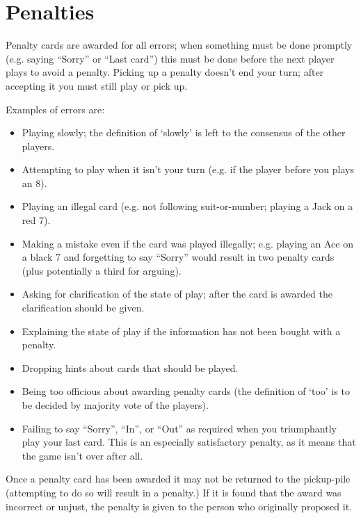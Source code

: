 \documentclass[12pt]{article}
\begin{document}
\section{Penalties}
\label{penalties}

Penalty cards are awarded for all errors; when something must be done promptly (e.g. saying ``Sorry'' or
``Last card'') this must be done before the next player plays to avoid a penalty.  Picking up a penalty
doesn't end your turn; after accepting it you must still play or pick up.

Examples of errors are:

\begin{itemize}
  \item Playing slowly;  the definition of `slowly' is left to the consensus of the other players.

  \item Attempting to play when it isn't your turn (e.g. if the player before you plays an 8).

  \item Playing an illegal card (e.g. not following suit-or-number;  playing a Jack on a red 7).

  \item Making a mistake even if the card was played illegally;  e.g. playing an Ace on a
    black 7 and forgetting to say ``Sorry'' would result in two penalty cards (plus potentially
    a third for arguing).

  \item Asking for clarification of the state of play;  after the card is awarded the
    clarification should be given.

  \item Explaining the state of play if the information has not been bought with a penalty.
    
  \item Dropping hints about cards that should be played.

  \item Being too officious about awarding penalty cards (the definition of `too' is
    to be decided by majority vote of the players).

  \item Failing to say ``Sorry'', ``In'', or ``Out'' as required when you triumphantly play your last card.  This is an
    especially satisfactory penalty, as it means that the game isn't over after all.
\end{itemize}

Once a penalty card has been awarded it may not be returned to the pickup-pile (attempting to do so will result in a penalty.)  If it is found that the award was
incorrect or unjust, the penalty is given to the person who originally proposed it.
\end{document}
